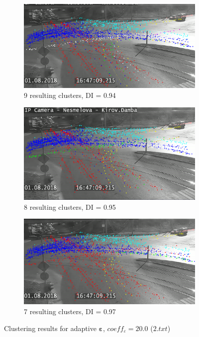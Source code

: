 \begin{figure}[!htb]
	\centering
	\begin{subfigure}[!htb]{0.8\textwidth}
		\centering{}
		\includegraphics[width=\textwidth]{images/9cl-di-94.png}
		\caption{9 resulting clusters, DI = 0.94}
		\label{fig:9cl-di-94}
	\end{subfigure}
	\hfill
	\begin{subfigure}[!htb]{0.8\textwidth}
		\centering{}
		\includegraphics[width=\textwidth]{images/8cl-di-95.png}
		\caption{8 resulting clusters, DI = 0.95}
		\label{fig:8cl-di-95}
	\end{subfigure}
	\hfill
	\begin{subfigure}[!htb]{0.8\textwidth}
		\centering{}
		\includegraphics[width=\textwidth]{images/7cl-di-97.png}
		\caption{7 resulting clusters, DI = 0.97}
		\label{fig:7cl-di-97}
	\end{subfigure}
	\caption{Clustering results for adaptive $\bm{\varepsilon}$, $coeff_\varepsilon = 20.0$ ($2.txt$)}
	\label{fig:clust-res}
\end{figure}

